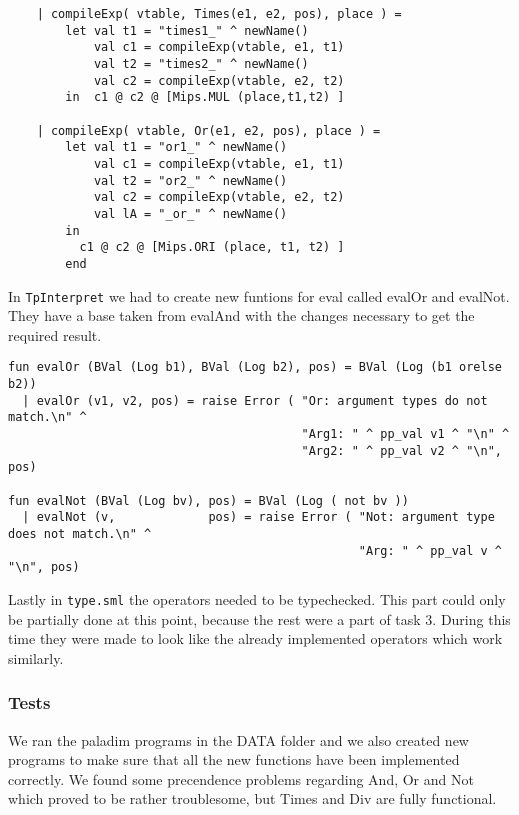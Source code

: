 \documentclass[11pt]{article}
\begin{document}
\begin{lstlisting}
    | compileExp( vtable, Times(e1, e2, pos), place ) =
        let val t1 = "times1_" ^ newName()
            val c1 = compileExp(vtable, e1, t1)
            val t2 = "times2_" ^ newName()
            val c2 = compileExp(vtable, e2, t2)
        in  c1 @ c2 @ [Mips.MUL (place,t1,t2) ]
        
    | compileExp( vtable, Or(e1, e2, pos), place ) =
        let val t1 = "or1_" ^ newName()
            val c1 = compileExp(vtable, e1, t1)
            val t2 = "or2_" ^ newName()
            val c2 = compileExp(vtable, e2, t2)
            val lA = "_or_" ^ newName()
        in
          c1 @ c2 @ [Mips.ORI (place, t1, t2) ]
        end
\end{lstlisting}        

In {\tt TpInterpret} we had to create new funtions for eval called evalOr and evalNot. They have a base taken from evalAnd with the changes necessary to get the required result.

\begin{lstlisting}
fun evalOr (BVal (Log b1), BVal (Log b2), pos) = BVal (Log (b1 orelse b2))
  | evalOr (v1, v2, pos) = raise Error ( "Or: argument types do not match.\n" ^
                                         "Arg1: " ^ pp_val v1 ^ "\n" ^
                                         "Arg2: " ^ pp_val v2 ^ "\n", pos)
                                         
fun evalNot (BVal (Log bv), pos) = BVal (Log ( not bv ))
  | evalNot (v,             pos) = raise Error ( "Not: argument type does not match.\n" ^
                                                 "Arg: " ^ pp_val v ^ "\n", pos)
\end{lstlisting}

Lastly in {\tt type.sml} the operators needed to be typechecked. This part could only be partially done at this point, because the rest were a part of task 3. During this time they were made to look like the already implemented operators which work similarly.

\subsubsection*{Tests}
We ran the paladim programs in the DATA folder and we also created new programs to make sure that all the new functions have been implemented correctly. We found some precendence problems regarding And, Or and Not which proved to be rather troublesome, but Times and Div are fully functional.
\end{document}
